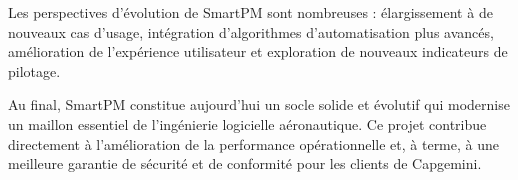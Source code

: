 Les perspectives d'\'evolution de SmartPM sont nombreuses : \'elargissement \`a de nouveaux cas d'usage, int\'egration d'algorithmes d'automatisation plus avanc\'es, am\'elioration de l'exp\'erience utilisateur et exploration de nouveaux indicateurs de pilotage.

Au final, SmartPM constitue aujourd'hui un socle solide et \'evolutif qui modernise un maillon essentiel de l'ing\'enierie logicielle a\'eronautique. Ce projet contribue directement \`a l'am\'elioration de la performance op\'erationnelle et, \`a terme, \`a une meilleure garantie de s\'ecurit\'e et de conformit\'e pour les clients de Capgemini.

